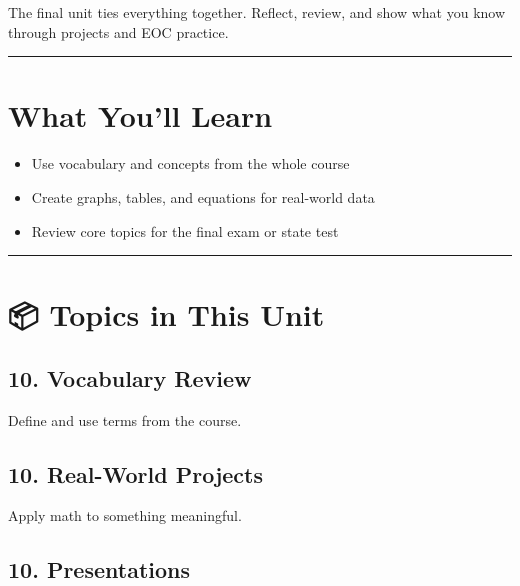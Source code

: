 \documentclass[
  letterpaper,
]{scrrept}
\providecommand{\tightlist}{%
  \setlength{\itemsep}{0pt}\setlength{\parskip}{0pt}}
\begin{document}
The final unit ties everything together. Reflect, review, and show what
you know through projects and EOC practice.

\begin{center}\rule{0.5\linewidth}{0.5pt}\end{center}

\section*{What You'll Learn}\label{what-youll-learn-8}


\begin{itemize}
\tightlist
\item
  Use vocabulary and concepts from the whole course
\item
  Create graphs, tables, and equations for real-world data
\item
  Review core topics for the final exam or state test
\end{itemize}

\begin{center}\rule{0.5\linewidth}{0.5pt}\end{center}

\section*{📦 Topics in This Unit}\label{topics-in-this-unit-8}


\subsection*{10. Vocabulary Review}\label{vocabulary-review}

Define and use terms from the course.

\subsection*{10. Real-World Projects}\label{real-world-projects}

Apply math to something meaningful.

\subsection*{10. Presentations}\label{presentations}
\end{document}
